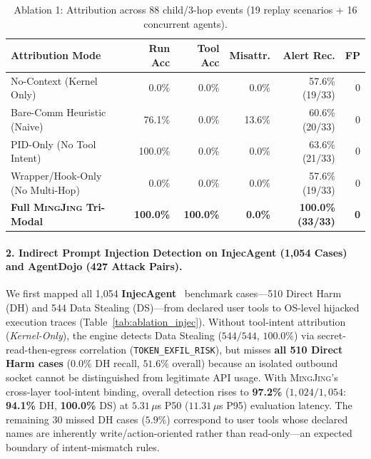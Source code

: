 \documentclass[10pt,twocolumn,letterpaper]{article}
\newcommand{\sys}{\textsc{MingJing}}
\newcommand{\code}[1]{\texttt{\small #1}}
\begin{document}
\begin{table}[t]
\centering
\scriptsize
\setlength{\tabcolsep}{2.2pt}
\caption{Ablation 1: Attribution across 88 child/3-hop events (19 replay scenarios + 16 concurrent agents).}
\label{tab:ablation_attr}
\begin{tabular}{@{}lrrrrr@{}}
\toprule
\textbf{Attribution Mode} & \textbf{Run Acc} & \textbf{Tool Acc} & \textbf{Misattr.} & \textbf{Alert Rec.} & \textbf{FP} \\
\midrule
No-Context (Kernel Only)         & 0.0\%   & 0.0\%   & 0.0\%  & 57.6\% (19/33) & 0 \\
Bare-Comm Heuristic (Naive)      & 76.1\%  & 0.0\%   & 13.6\% & 60.6\% (20/33) & 0 \\
PID-Only (No Tool Intent)        & 100.0\% & 0.0\%   & 0.0\%  & 63.6\% (21/33) & 0 \\
Wrapper/Hook-Only (No Multi-Hop) & 0.0\%   & 0.0\%   & 0.0\%  & 57.6\% (19/33) & 0 \\
\textbf{Full \sys{} Tri-Modal}   & \textbf{100.0\%} & \textbf{100.0\%} & \textbf{0.0\%} & \textbf{100.0\% (33/33)} & \textbf{0} \\
\bottomrule
\end{tabular}
\end{table}

\paragraph{2. Indirect Prompt Injection Detection on InjecAgent (1,054 Cases) and AgentDojo (427 Attack Pairs).}
We first mapped all 1,054 \textbf{InjecAgent}~\cite{injecagent2024} benchmark cases---510 Direct Harm (DH) and 544 Data Stealing (DS)---from declared user tools to OS-level hijacked execution traces (Table~\ref{tab:ablation_injec}). Without tool-intent attribution (\emph{Kernel-Only}), the engine detects Data Stealing ($544/544$, $100.0\%$) via secret-read-then-egress correlation (\code{TOKEN\_EXFIL\_RISK}), but misses \textbf{all 510 Direct Harm cases} ($0.0\%$ DH recall, $51.6\%$ overall) because an isolated outbound socket cannot be distinguished from legitimate API usage. With \sys{}'s cross-layer tool-intent binding, overall detection rises to \textbf{97.2\%} ($1{,}024/1{,}054$: \textbf{94.1\%} DH, \textbf{100.0\%} DS) at $5.31\,\mu$s P50 ($11.31\,\mu$s P95) evaluation latency. The remaining 30 missed DH cases ($5.9\%$) correspond to user tools whose declared names are inherently write/action-oriented rather than read-only---an expected boundary of intent-mismatch rules.
\end{document}

